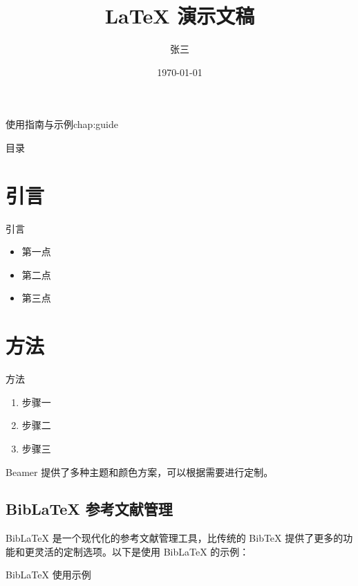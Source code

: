 \begin{cuzchapter}{使用指南与示例}{chap:guide}
\begin{listing}[htbp]
\begin{texcode}
			\title{LaTeX 演示文稿}
			\author{张三}
			\date{\today}

			

			\begin{frame}
				\titlepage
			\end{frame}

			\begin{frame}{目录}
				\tableofcontents
			\end{frame}

			\section{引言}

			\begin{frame}{引言}
				\begin{itemize}
					\item 第一点
					\item 第二点
					\item 第三点
				\end{itemize}
			\end{frame}

			\section{方法}

			\begin{frame}{方法}
				\begin{enumerate}
					\item 步骤一
					\item 步骤二
					\item 步骤三
				\end{enumerate}
			\end{frame}

			
		\end{texcode}
	\end{listing}

	Beamer 提供了多种主题和颜色方案，可以根据需要进行定制。

	\subsection{BibLaTeX 参考文献管理}\label{sub:biblatex}

	BibLaTeX 是一个现代化的参考文献管理工具，比传统的 BibTeX 提供了更多的功能和更灵活的定制选项。以下是使用 BibLaTeX 的示例：

	\begin{listing}[htbp]
		\caption{BibLaTeX 使用示例}
		\label{code:biblatex-example}
		\begin{texcode}
			\usepackage[
				backend=biber,
				style=gb7714-2015,
				sorting=nyt,
				giveninits=true
			]{biblatex}


\end{texcode}
\end{listing}
\end{cuzchapter}
